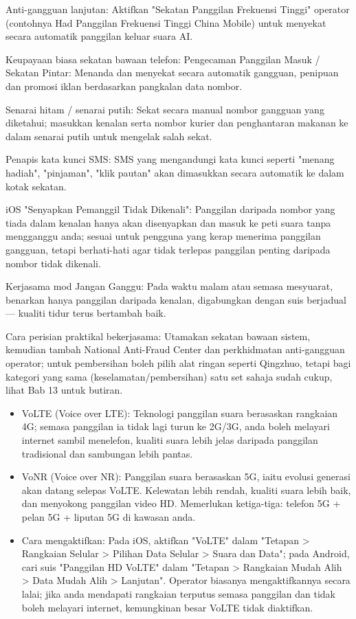 Anti-gangguan lanjutan: Aktifkan "Sekatan Panggilan Frekuensi Tinggi" operator (contohnya Had Panggilan Frekuensi Tinggi China Mobile) untuk menyekat secara automatik panggilan keluar suara AI.

Keupayaan biasa sekatan bawaan telefon: Pengecaman Panggilan Masuk / Sekatan Pintar: Menanda dan menyekat secara automatik gangguan, penipuan dan promosi iklan berdasarkan pangkalan data nombor.

Senarai hitam / senarai putih: Sekat secara manual nombor gangguan yang diketahui; masukkan kenalan serta nombor kurier dan penghantaran makanan ke dalam senarai putih untuk mengelak salah sekat.

Penapis kata kunci SMS: SMS yang mengandungi kata kunci seperti "menang hadiah", "pinjaman", "klik pautan" akan dimasukkan secara automatik ke dalam kotak sekatan.

iOS "Senyapkan Pemanggil Tidak Dikenali": Panggilan daripada nombor yang tiada dalam kenalan hanya akan disenyapkan dan masuk ke peti suara tanpa mengganggu anda; sesuai untuk pengguna yang kerap menerima panggilan gangguan, tetapi berhati-hati agar tidak terlepas panggilan penting daripada nombor tidak dikenali.

Kerjasama mod Jangan Ganggu: Pada waktu malam atau semasa mesyuarat, benarkan hanya panggilan daripada kenalan, digabungkan dengan suis berjadual — kualiti tidur terus bertambah baik.

Cara perisian praktikal bekerjasama: Utamakan sekatan bawaan sistem, kemudian tambah National Anti-Fraud Center dan perkhidmatan anti-gangguan operator; untuk pembersihan boleh pilih alat ringan seperti Qingzhuo, tetapi bagi kategori yang sama (keselamatan/pembersihan) satu set sahaja sudah cukup, lihat Bab 13 untuk butiran.


\begin{itemize}
  \item VoLTE (Voice over LTE): Teknologi panggilan suara berasaskan rangkaian 4G; semasa panggilan ia tidak lagi turun ke 2G/3G, anda boleh melayari internet sambil menelefon, kualiti suara lebih jelas daripada panggilan tradisional dan sambungan lebih pantas.
  \item VoNR (Voice over NR): Panggilan suara berasaskan 5G, iaitu evolusi generasi akan datang selepas VoLTE. Kelewatan lebih rendah, kualiti suara lebih baik, dan menyokong panggilan video HD. Memerlukan ketiga-tiga: telefon 5G + pelan 5G + liputan 5G di kawasan anda.
  \item Cara mengaktifkan: Pada iOS, aktifkan "VoLTE" dalam "Tetapan > Rangkaian Selular > Pilihan Data Selular > Suara dan Data"; pada Android, cari suis "Panggilan HD VoLTE" dalam "Tetapan > Rangkaian Mudah Alih > Data Mudah Alih > Lanjutan". Operator biasanya mengaktifkannya secara lalai; jika anda mendapati rangkaian terputus semasa panggilan dan tidak boleh melayari internet, kemungkinan besar VoLTE tidak diaktifkan.
\end{itemize}

